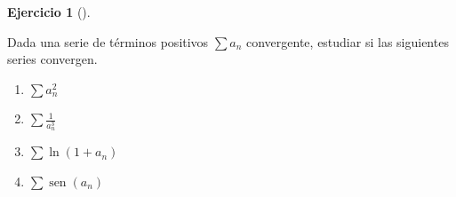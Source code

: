 \documentclass[
  spanish,
  a4paper,
]{scrreport}
\theoremstyle{definition}
\newtheorem{exercise}{Ejercicio}[chapter]
\theoremstyle{remark}
\begin{document}
\begin{exercise}[]\protect\hypertarget{exr-series-positivas-convergentes}{}\label{exr-series-positivas-convergentes}

Dada una serie de términos positivos \(\sum a_n\) convergente, estudiar
si las siguientes series convergen.

\begin{enumerate}
\def\labelenumi{\alph{enumi}.}
\item
  \(\sum a_n^2\)
\item
  \(\sum \frac{1}{a_n^3}\)
\item
  \(\sum \ln(1+a_n)\)
\item
  \(\sum \operatorname{sen}(a_n)\)
\end{enumerate}

\end{exercise}
\end{document}
